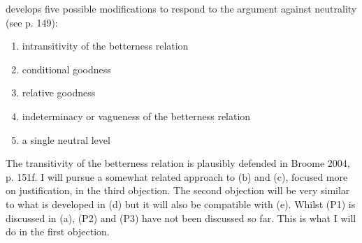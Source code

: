  develops five possible modifications to respond to the argument against neutrality (see p. 149):  

\begin{enumerate} \item intransitivity of the betterness relation \item conditional goodness \item relative goodness \item indeterminacy or vagueness of the betterness relation \item a single neutral level \end{enumerate} The transitivity of the betterness relation is plausibly defended in \label{ref:RNDLa97xVELwW}Broome 2004, p. 151f. I will pursue a somewhat related approach to (b) and (c), focused more on justification, in the third objection. The second objection will be very similar to what is developed in (d) but it will also be compatible with (e). Whilst (P1) is discussed in (a), (P2) and (P3) have not been discussed so far. This is what I will do in the first objection.  